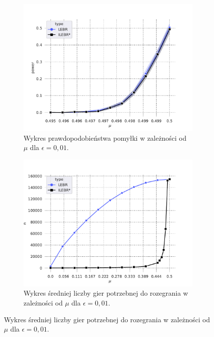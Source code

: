 \documentclass[inzynierska]{pwr_wmat_praca_dyplomowa}
\theoremstyle{plain}
\numberwithin{theorem}{chapter}
\theoremstyle{definition}
\numberwithin{theorem}{chapter}
\begin{document}
	\begin{figure}
		\captionsetup[subfigure]{width=0.8\textwidth}
		\centering
		\begin{subfigure}{0,8\textwidth}
			\includegraphics[width=1\linewidth]{imagens/test_powrs_same_n_max.pdf}
			\caption{Wykres prawdopodobieństwa pomyłki w zależności od $\mu$ dla $\epsilon=0,01$.}
			\label{fig:power_same_n_max}
		\end{subfigure}
		\begin{subfigure}{.5\textwidth}
			\centering
			\includegraphics[width=1\linewidth]{imagens/needed_games_to_play_same_n_max.pdf}
			\caption{Wykres średniej liczby gier potrzebnej do rozegrania w zależności od $\mu$ dla $\epsilon=0,01$.}
			\label{fig:power_same_n_max_log}

\end{subfigure}
\end{figure}
\end{document}
